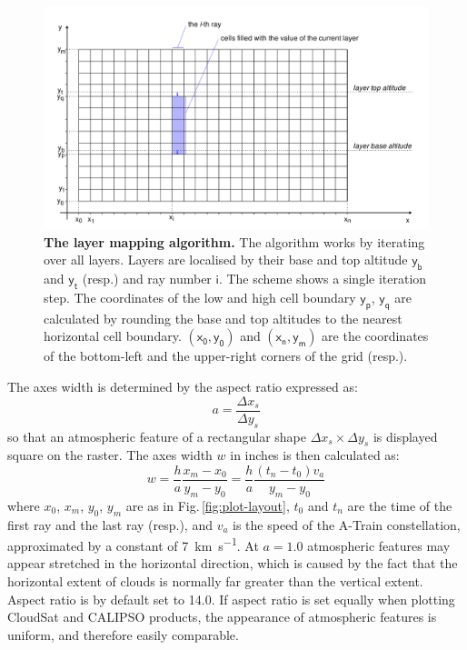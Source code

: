 \begin{figure}[t]
\includegraphics[width=400pt]{images/layermap.pdf}
\caption[The layer mapping algorithm]{\textbf{The layer mapping algorithm.} The algorithm works by iterating
over all layers. Layers are localised by their base and top altitude
$\mathsf{y_b}$ and $\mathsf{y_t}$ (resp.) and
ray number $\mathsf{i}$. The scheme shows a single iteration step. The
coordinates of the low and high cell boundary
$\mathsf{y_p}$, $\mathsf{y_q}$ are calculated by rounding the base and top
altitudes to the nearest horizontal cell boundary.
$\mathsf{(x_0, y_0)}$ and $\mathsf{(x_n, y_m)}$ are the coordinates of the
bottom-left and the upper-right corners of the grid (resp.).}
\label{fig:layermap-algorithm}
\end{figure}


The axes width is determined by the aspect ratio expressed as:
$$
a = \frac{\Delta x_s}{\Delta y_s}
$$
so that an atmospheric feature of a rectangular shape $\Delta x_s \times \Delta
y_s$ is displayed square on the raster. The axes width $w$ in inches is then
calculated as:
$$
w = \frac{h}{a} \frac{x_m - x_0}{y_m - y_0} = \frac{h}{a} \frac{(t_n - t_0)
v_a}{y_m - y_0}
$$
where $x_0$, $x_m$, $y_0$, $y_m$ are as in
Fig.\,\ref{fig:plot-layout}, $t_0$ and $t_n$ are the time of the first ray and the last ray
(resp.), and $v_a$ is the speed of the A-Train constellation, approximated by a
constant of \SI{7}{km s^{-1}}. At $a = 1.0$ atmospheric features may appear
stretched in the horizontal direction, which is caused by the fact that the
horizontal extent of clouds is normally far greater than the vertical extent.
Aspect ratio is by default set to 14.0. If aspect ratio is set equally when
plotting CloudSat and CALIPSO products, the appearance of atmospheric features
is uniform, and therefore easily comparable.

